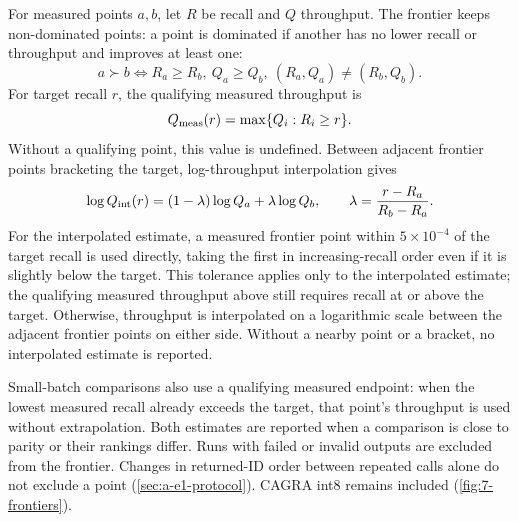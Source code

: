 For measured points $a,b$, let $R$ be recall and $Q$ throughput.
The frontier keeps non-dominated points: a point is dominated if another
has no lower recall or throughput and improves at least one:
\[
 a\succ b\iff R_a\geq R_b,\ Q_a\geq Q_b,\
 (R_a,Q_a)\ne(R_b,Q_b).
\]
For target recall $r$, the qualifying measured throughput is
\begin{equation}
Q_{\rm meas}(r)=\max\{Q_i:R_i\geq r\}.
\label{eq:3-measured-frontier}
\end{equation}
Without a qualifying point, this value is undefined. Between adjacent
frontier points bracketing the target, log-throughput interpolation gives
\begin{equation}
\log Q_{\rm int}(r)=(1-\lambda)\log Q_a+\lambda\log Q_b,
\qquad \lambda=\frac{r-R_a}{R_b-R_a}.
\label{eq:3-interpolated-frontier}
\end{equation}
For the interpolated estimate, a measured frontier point within
$5\times10^{-4}$ of the target recall is used directly, taking the first
in increasing-recall order even if it is slightly below the target.
This tolerance applies only to the interpolated estimate; the qualifying
measured throughput above still requires recall at or above the target.
Otherwise, throughput is interpolated on a logarithmic scale between
the adjacent frontier points on either side. Without a nearby point or
a bracket, no interpolated estimate is reported.

Small-batch comparisons also use a qualifying measured endpoint: when
the lowest measured recall already exceeds the target, that point's
throughput is used without extrapolation. Both estimates are reported
when a comparison is close to parity or their rankings differ.
Runs with failed or invalid outputs are excluded from the frontier.
Changes in returned-ID order between repeated calls alone do not
exclude a point (\cref{sec:a-e1-protocol}). CAGRA int8 remains included
(\cref{fig:7-frontiers}).
